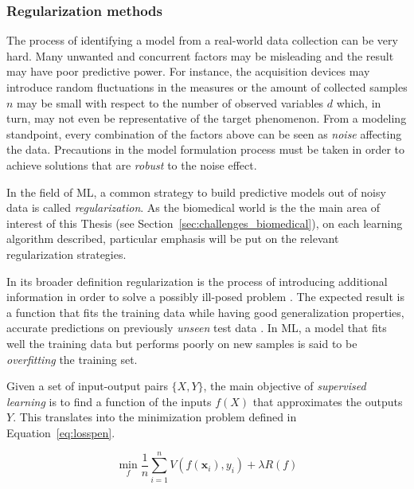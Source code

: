     \subsubsection{Regularization methods}
    The process of identifying a model from a real-world data collection can be very hard. Many unwanted and concurrent factors may be misleading and the result may have poor predictive power. For instance, the acquisition devices may introduce random fluctuations in the measures or the amount of collected samples $n$ may be small with respect to the number of observed variables $d$ which, in turn, may not even be representative of the target phenomenon. From a modeling standpoint, every combination of the factors above can be seen as \textit{noise} affecting the data.
    Precautions in the model formulation process must be taken in order to achieve solutions that are \textit{robust} to the noise effect.

    In the field of ML, a common strategy to build predictive models out of noisy data is called \textit{regularization}. As the biomedical world is the the main area of interest of this Thesis (see Section~\ref{sec:challenges_biomedical}), on each learning algorithm described, particular emphasis will be put on the relevant regularization strategies.

    In its broader definition regularization is the process of introducing additional information in order to solve a possibly ill-posed problem \cite{tikhonov1963solution, evgeniou2000regularization}. The expected result is a function that fits the training data while having good generalization properties, \ie accurate predictions on previously  \textit{unseen} test data \cite{hastie2009elements}. In ML, a model that fits well the training data but performs poorly on new samples is said to be \textit{overfitting} the training set.

    Given a set of input-output pairs $\{X, Y\}$, the main objective of {\em supervised learning} is to find a function of the inputs $f(X)$ that approximates the outputs $Y$. This translates into the minimization problem defined in Equation~\eqref{eq:losspen}.

    \begin{equation}\label{eq:losspen}
    	\min_f \frac{1}{n}\sum_{i=1}^n V(f(\bm{x}_i),y_i) + \lambda R(f)
    \end{equation}

